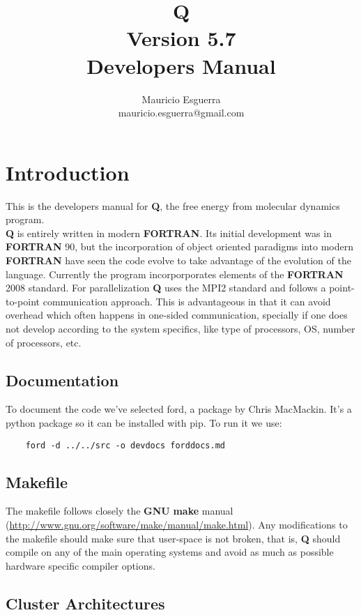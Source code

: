 \documentclass[10pt, oneside, pdftex]{article}
\title{Q\\
    \LARGE Version 5.7 \\
    \LARGE \vspace*{-10pt}Developers Manual\vspace*{10pt}}
\author{
  \vspace{10pt}
  Mauricio Esguerra \\
  \vspace{4pt}
  mauricio.esguerra@gmail.com \\
  \vspace{20pt}
  }
\makeatletter
\def\printtitle{
{\color{bl} \centering \Huge \textbf{\@title}\par}} %
\def\printauthor{                        %
{\centering \small \@author}}            %
\makeatother
\begin{document}
\printtitle
\printauthor
\tableofcontents
%

\vspace{20pt}
\section{Introduction}
This is  the developers manual  for \textbf{Q}, the free  energy from
molecular dynamics program.\\
\noindent \textbf{Q}  is entirely written in  modern \textbf{FORTRAN}.
Its  initial   development  was   in  \textbf{FORTRAN}  90,   but  the
incorporation    of   object    oriented    paradigms   into    modern
\textbf{FORTRAN} have  seen the code  evolve to take advantage  of the
evolution  of the  language.   Currently  the program  incorporporates
elements of  the \textbf{FORTRAN}  2008 standard.  For parallelization
\textbf{Q}  uses  the  MPI2  standard  and  follows  a  point-to-point
communication  approach. This  is advantageous  in that  it can  avoid
overhead which often happens  in one-sided communication, specially if
one does not  develop according to the system specifics,  like type of
processors, OS, number of processors, etc.


\subsection{Documentation}
\label{documentation}
To document the code we've selected ford, a package by Chris
MacMackin. It's a python package so it can be installed with pip.
To run it we use:
\begin{Verbatim}
    ford -d ../../src -o devdocs forddocs.md
\end{Verbatim}

\subsection{Makefile}
\label{makefile}
The  makefile follows  closely the  \textbf{GNU} \textbf{make}  manual
(\url{http://www.gnu.org/software/make/manual/make.html}).         Any
modifications to the makefile should  make sure that user-space is not
broken,  that  is,  \textbf{Q}  should  compile on  any  of  the  main
operating  systems and  avoid as  much as  possible hardware  specific
compiler options.\\

\subsection{Cluster Architectures}
\label{clusterarchitectures}
\end{document}
